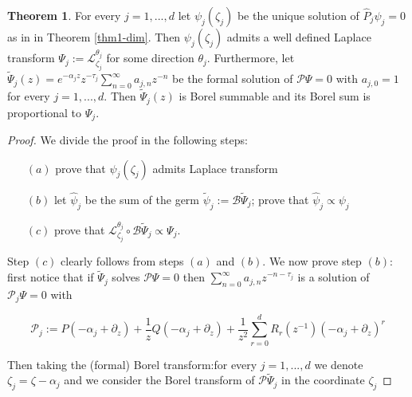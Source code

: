 \documentclass{article}
\theoremstyle{definition}
\newcommand{\series}[1]{\tilde{#1}}
\newcommand{\laplace}{\mathcal{L}}
\newcommand{\borel}{\mathcal{B}}
\newtheorem{theorem}{Theorem}[section]
\begin{document}
\begin{theorem}\label{thm2-dim}
For every $j=1,...,d$ let $\psi_j(\zeta_j)$ be the unique solution of $\hat{P}_j\psi_j=0$ as in in Theorem \ref{thm1-dim}. Then $\psi_j(\zeta_j)$ admits a well defined Laplace transform $\Psi_j:=\laplace_{\zeta_j}^{\theta_j}$ for some direction $\theta_j$.
Furthermore, let $\tilde{\Psi}_j(z)=e^{-\alpha_j z}z^{-\tau_j}\sum_{n=0}^{\infty}a_{j,n}z^{-n}$ be the formal solution of $\mathcal{P}\Psi=0$ with $a_{j,0}=1$ for every $j=1,...,d$. Then $\series{\Psi}_j(z)$ is Borel summable and its Borel sum is proportional to $\Psi_j$. 
\end{theorem}
\begin{proof}
We divide the proof in the following steps:
\begin{itemize}
\item[$(a)$] prove that $\psi_j(\zeta_j)$ admits Laplace transform 
\item[$(b)$] let $\hat{\psi}_j$ be the sum of the germ $\series{\psi}_j:=\borel\series{\Psi}_j$; prove that $\hat{\psi}_j \propto \psi_j$ 
\item[$(c)$] prove that $\laplace_{\zeta_j}^{\theta_j}\circ\borel\series{\Psi}_j\propto \Psi_j $. 
\end{itemize}

Step $(c)$ clearly follows from steps $(a)$ and $(b)$. We now prove step $(b)$: first notice that if $\series{\Psi}_j$ solves $\mathcal{P}\Psi=0$ then $\sum_{n=0}^{\infty}a_{j,n}z^{-n-\tau_j}$ is a solution of $\mathcal{P}_j\Psi=0$ with

\begin{equation}
\mathcal{P}_j:=P(-\alpha_j+\partial_z)+\frac{1}{z}Q(-\alpha_j+\partial_z)+\frac{1}{z^2}\sum_{r=0}^dR_r(z^{-1})(-\alpha_j+\partial_z)^r
\end{equation} 

\color{brown}
Then taking the (formal) Borel transform:for every $j=1,...,d$ we denote $\zeta_j=\zeta-\alpha_j$ and we consider the Borel transform of $\mathcal{P}\series{\Psi}_j$ in the coordinate $\zeta_j$ 



\end{proof}
\end{document}
